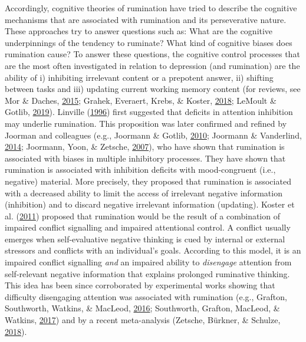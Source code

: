 \documentclass[a4paper,12pt,twoside,onecolumn,openright,final,oldfontcommands]{memoir}
\begin{document}
Accordingly, cognitive theories of rumination have tried to describe the cognitive mechanisms that are associated with rumination and its perseverative nature. These approaches try to answer questions such as: What are the cognitive underpinnings of the tendency to ruminate? What kind of cognitive biases does rumination cause? To answer these questions, the cognitive control processes that are the most often investigated in relation to depression (and rumination) are the ability of i) inhibiting irrelevant content or a prepotent answer, ii) shifting between tasks and iii) updating current working memory content (for reviews, see Mor \& Daches, \protect\hyperlink{ref-mor_ruminative_2015}{2015}; Grahek, Everaert, Krebs, \& Koster, \protect\hyperlink{ref-grahek_cognitive_2018}{2018}; LeMoult \& Gotlib, \protect\hyperlink{ref-lemoult_depression_2019}{2019}). Linville (\protect\hyperlink{ref-linville_attention_1996}{1996}) first suggested that deficits in attention inhibition may underlie rumination. This proposition was later confirmed and refined by Joorman and colleagues (e.g., Joormann \& Gotlib, \protect\hyperlink{ref-joormann_emotion_2010}{2010}; Joormann \& Vanderlind, \protect\hyperlink{ref-joormann_emotion_2014}{2014}; Joormann, Yoon, \& Zetsche, \protect\hyperlink{ref-joormann_cognitive_2007}{2007}), who have shown that rumination is associated with biases in multiple inhibitory processes. They have shown that rumination is associated with inhibition deficits with mood-congruent (i.e., negative) material. More precisely, they proposed that rumination is associated with a decreased ability to limit the access of irrelevant negative information (inhibition) and to discard negative irrelevant information (updating). Koster et al. (\protect\hyperlink{ref-Koster2011}{2011}) proposed that rumination would be the result of a combination of impaired conflict signalling and impaired attentional control. A conflict usually emerges when self-evaluative negative thinking is cued by internal or external stressors and conflicts with an individual's goals. According to this model, it is an impaired conflict signalling \emph{and} an impaired ability to \emph{disengage} attention from self-relevant negative information that explains prolonged ruminative thinking. This idea has been since corroborated by experimental works showing that difficulty disengaging attention was associated with rumination (e.g., Grafton, Southworth, Watkins, \& MacLeod, \protect\hyperlink{ref-grafton_stuck_2016}{2016}; Southworth, Grafton, MacLeod, \& Watkins, \protect\hyperlink{ref-southworth_heightened_2017}{2017}) and by a recent meta-analysis (Zetsche, Bürkner, \& Schulze, \protect\hyperlink{ref-zetsche_shedding_2018}{2018}).
\end{document}
